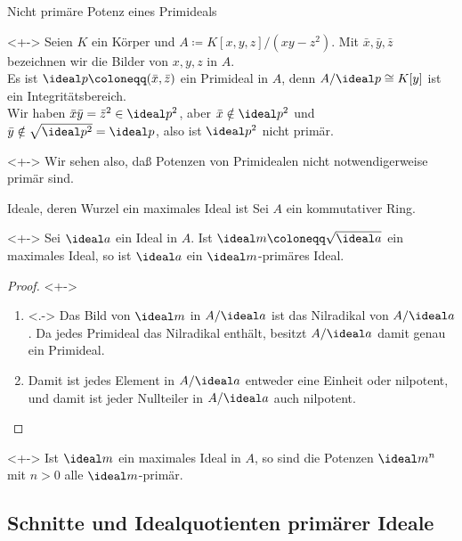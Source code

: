 \begin{frame}{Nicht primäre Potenz eines Primideals}
	\begin{example}<+->
		Seien \(K\) ein Körper und \(A \coloneqq K[x, y, z]/(xy - z^2)\). Mit \(\bar x, \bar y, \bar z\) bezeichnen wir die
		Bilder von \(x, y, z\) in \(A\).
		\\
		Es ist \(\ideal p \coloneqq (\bar x, \bar z)\) ein Primideal in \(A\), denn \(A/\ideal p \cong K[y]\) ist ein Integritätsbereich.
		\\
		Wir haben \(\bar x \bar y = \bar z^2 \in \ideal p^2\), aber \(\bar x \notin \ideal p^2\) und \(\bar y \notin \sqrt{\ideal p^2}
		= \ideal p\), also ist \(\ideal p^2\) nicht primär.
	\end{example}
	\begin{visibleenv}<+->
		Wir sehen also, daß Potenzen von Primidealen nicht notwendigerweise primär sind.
	\end{visibleenv}
\end{frame}

\begin{frame}{Ideale, deren Wurzel ein maximales Ideal ist}
	Sei \(A\) ein kommutativer Ring.
	\begin{proposition}<+->
		Sei \(\ideal a\) ein Ideal in \(A\). Ist \(\ideal m \coloneqq \sqrt{\ideal a}\) ein maximales Ideal, so ist \(\ideal a\) ein
		\(\ideal m\)-primäres
		Ideal.
	\end{proposition}
	\begin{proof}<+->
		\begin{enumerate}[<+->]
		\item<.->
			Das Bild von \(\ideal m\) in \(A/\ideal a\) ist das Nilradikal von \(A/\ideal a\). Da jedes Primideal das Nilradikal enthält,
			besitzt \(A/\ideal a\) damit genau ein Primideal.
		\item
			Damit ist jedes Element in \(A/\ideal a\) entweder eine Einheit oder nilpotent, und damit ist jeder Nullteiler in
			\(A/\ideal a\) auch nilpotent.
			\qedhere
		\end{enumerate}
	\end{proof}
	\begin{example}<+->
		Ist \(\ideal m\) ein maximales Ideal in \(A\), so sind die Potenzen \(\ideal m^n\) mit \(n > 0\) alle \(\ideal m\)-primär.
	\end{example}
\end{frame}

\subsection{Schnitte und Idealquotienten primärer Ideale}

